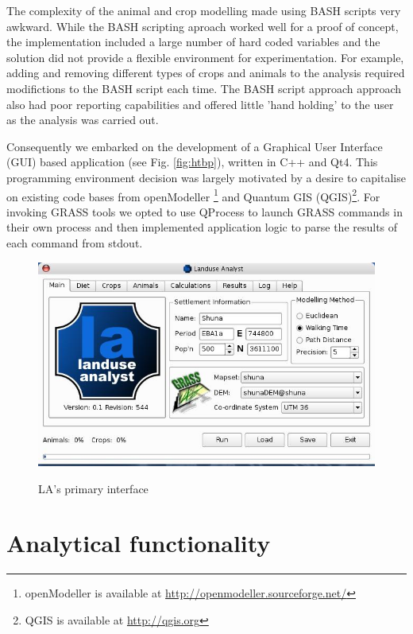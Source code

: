The complexity of the animal and crop modelling made using BASH scripts very
awkward.  While the BASH scripting aproach worked well for a proof of concept,
the implementation included a large number of hard coded variables and the solution 
did not provide a flexible environment for experimentation. For example, adding 
and removing different types of crops and animals to the analysis required modifictions 
to the BASH script each time. The BASH script approach approach also had poor reporting
capabilities and offered little 'hand holding' to the user as the analysis was 
carried out.

Consequently we embarked on the development of a Graphical User Interface (GUI) based 
application (see Fig. \ref{fig:htbp}), written in C++ and Qt4. This programming environment decision was largely 
motivated by a desire to capitalise on existing code bases from openModeller
\footnote{openModeller is available at \url{http://openmodeller.sourceforge.net/}} 
and Quantum GIS (QGIS)\footnote{QGIS is available at \url{http://qgis.org}}.  
For invoking GRASS tools we opted to use QProcess to launch GRASS commands in 
their own process and then implemented application logic to parse the results of 
each command from stdout.

\begin{figure}[htbp] %
  \includegraphics[scale=0.37]{./images/LanduseAnalyst544.jpg}
   \label{fig:euclideanResults} \caption{LA's primary interface}
   \end{figure}


\section{Analytical functionality} \label{sec:Analytical Functionality}

